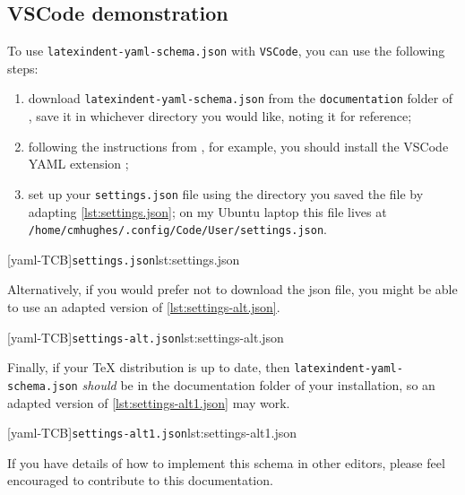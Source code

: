  \subsection{VSCode demonstration}
  To use \texttt{latexindent-yaml-schema.json} with \texttt{VSCode}, you can use the
  following steps:  
  \begin{enumerate}
   \item download \texttt{latexindent-yaml-schema.json} from the \texttt{documentation} folder of
         \cite{latexindent-home}, save it in whichever directory you would like, noting it for
         reference;
   \item following the instructions from \cite{vscode-yaml-demo}, for example, you should install
         the VSCode YAML extension \cite{vscode-yaml-extentions};
   \item set up your \texttt{settings.json} file using the directory you saved the file by
         adapting \cref{lst:settings.json}; on my Ubuntu laptop this file lives at
         \texttt{/home/cmhughes/.config/Code/User/settings.json}.
  \end{enumerate}

  \begin{widepage}
   [yaml-TCB]{\texttt{settings.json}}{lst:settings.json}
  \end{widepage}

  Alternatively, if you would prefer not to download the json file, you might be able to
  use an adapted version of \cref{lst:settings-alt.json}.

  \begin{widepage}
   [yaml-TCB]{\texttt{settings-alt.json}}{lst:settings-alt.json}
  \end{widepage}

  Finally, if your TeX distribution is up to date, then
  \texttt{latexindent-yaml-schema.json} \emph{should} be in the documentation folder of
  your installation, so an adapted version of \cref{lst:settings-alt1.json} may work.

  \begin{widepage}
   [yaml-TCB]{\texttt{settings-alt1.json}}{lst:settings-alt1.json}
  \end{widepage}

  If you have details of how to implement this schema in other editors, please feel
  encouraged to contribute to this documentation.

